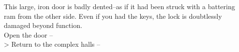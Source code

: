 This large, iron door is badly dented--as if it had been struck with a battering ram from the other side. Even if you had the keys, the lock is doubtlessly damaged beyond function.\\

 Open the door -- \\
> Return to the complex halls -- 